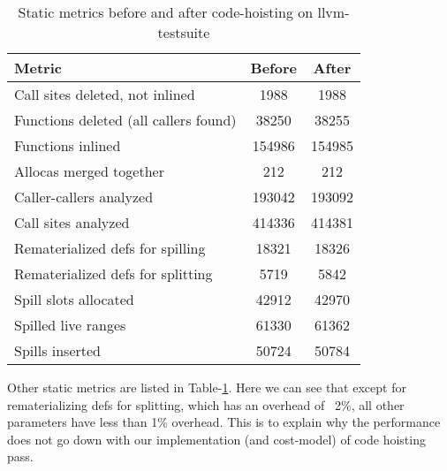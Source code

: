 \documentclass{sig-alternate}
\begin{document}
\begin{table}[h!]
  \begin{center}
    \begin{tabular}{|l|c|c|}
      \hline
      Metric               & Before & After              \\\hline
      Call sites deleted, not inlined             & 1988    & 1988   \\\hline
      Functions deleted (all callers found)       & 38250   & 38255  \\\hline
      Functions inlined                           & 154986  & 154985 \\\hline
      Allocas merged together                     & 212     & 212    \\\hline
      Caller-callers analyzed                     & 193042  & 193092 \\\hline
      Call sites analyzed                         & 414336  & 414381 \\\hline
      Rematerialized defs for spilling            & 18321   & 18326  \\\hline
      Rematerialized defs for splitting           & 5719    & 5842   \\\hline
      Spill slots allocated                       & 42912   & 42970  \\\hline
      Spilled live ranges                         & 61330   & 61362  \\\hline
      Spills inserted                             & 50724   & 50784  \\\hline
\end{tabular}
  \end{center}
  \caption{Static metrics before and after code-hoisting on llvm-testsuite}
  \label{tab:static-results}
\end{table}


Other static metrics are listed in Table-\ref{tab:static-results}. Here we can
see that except for rematerializing defs for splitting, which has an overhead of ~2\%, all
other parameters have less than 1\% overhead. This is to explain why the performance does not
go down with our implementation (and cost-model) of code hoisting pass.
\end{document}
